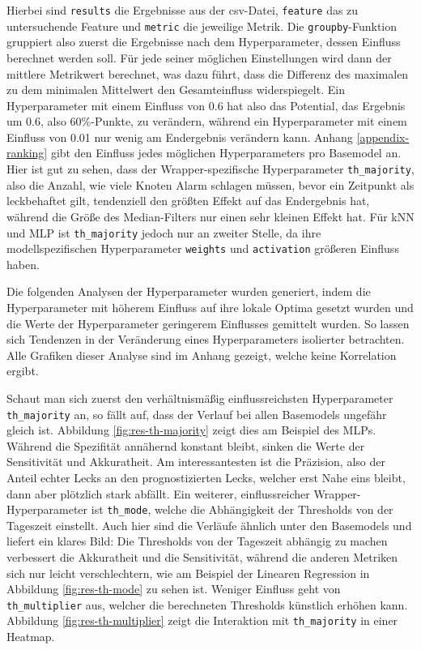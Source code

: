 Hierbei sind \texttt{results} die Ergebnisse aus der csv-Datei, \texttt{feature} das zu untersuchende Feature
 und \texttt{metric} die jeweilige Metrik. Die \texttt{groupby}-Funktion gruppiert also zuerst die Ergebnisse
 nach dem Hyperparameter, dessen Einfluss berechnet werden soll. Für jede seiner möglichen Einstellungen wird
 dann der mittlere Metrikwert berechnet, was dazu führt, dass die Differenz des maximalen zu dem minimalen
 Mittelwert den Gesamteinfluss widerspiegelt. Ein Hyperparameter mit einem Einfluss von 0.6 hat also das
 Potential, das Ergebnis um 0.6, also 60\%-Punkte, zu verändern, während ein Hyperparameter mit einem Einfluss
 von 0.01 nur wenig am Endergebnis verändern kann. Anhang \ref{appendix-ranking} gibt den Einfluss jedes
 möglichen Hyperparameters pro Basemodel an. Hier ist gut zu sehen, dass der Wrapper-spezifische Hyperparameter
 \texttt{th\_majority}, also die Anzahl, wie viele Knoten Alarm schlagen müssen, bevor ein Zeitpunkt als
 leckbehaftet gilt, tendenziell den größten Effekt auf das Endergebnis hat, während die Größe des Median-Filters
 nur einen sehr kleinen Effekt hat. Für kNN und MLP ist \texttt{th\_majority} jedoch nur an zweiter Stelle, da
 ihre modellspezifischen Hyperparameter \texttt{weights} und \texttt{activation} größeren Einfluss haben.

Die folgenden Analysen der Hyperparameter wurden generiert, indem die Hyperparameter mit höherem Einfluss auf
 ihre lokale Optima gesetzt wurden und die Werte der Hyperparameter geringerem Einflusses gemittelt wurden.
 So lassen sich Tendenzen in der Veränderung eines Hyperparameters isolierter betrachten. Alle Grafiken dieser
 Analyse sind im Anhang gezeigt, welche keine Korrelation ergibt.

Schaut man sich zuerst den verhältnismäßig einflussreichsten Hyperparameter \texttt{th\_majority} an, so fällt auf,
 dass der Verlauf bei allen Basemodels ungefähr gleich ist. Abbildung \ref{fig:res-th-majority} zeigt dies am
 Beispiel des MLPs. Während die Spezifität annähernd konstant bleibt, sinken die Werte der Sensitivität und
 Akkuratheit. Am interessantesten ist die Präzision, also der Anteil echter Lecks an den prognostizierten Lecks,
 welcher erst Nahe eins bleibt, dann aber plötzlich stark abfällt. Ein weiterer, einflussreicher
 Wrapper-Hyperparameter ist \texttt{th\_mode}, welche die Abhängigkeit der Thresholds von der Tageszeit einstellt.
 Auch hier sind die Verläufe ähnlich unter den Basemodels und liefert ein klares Bild: Die Thresholds von der
 Tageszeit abhängig zu machen verbessert die Akkuratheit und die Sensitivität, während die anderen Metriken sich
 nur leicht verschlechtern, wie am Beispiel der Linearen Regression in Abbildung \ref{fig:res-th-mode} zu sehen
 ist. Weniger Einfluss geht von \texttt{th\_multiplier} aus, welcher die berechneten Thresholds künstlich erhöhen
 kann. Abbildung \ref{fig:res-th-multiplier} zeigt die Interaktion mit \texttt{th\_majority} in einer Heatmap.

